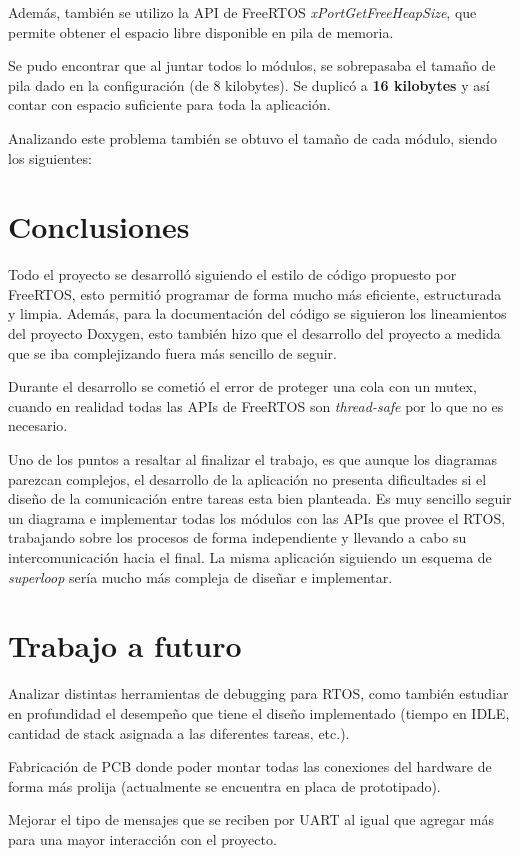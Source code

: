 \documentclass{IEEEtran}
\begin{document}
Además, también se utilizo la API de FreeRTOS \textit{xPortGetFreeHeapSize}, que permite obtener el espacio libre disponible en pila de memoria.

Se pudo encontrar que al juntar todos lo módulos, se sobrepasaba el tamaño de pila dado en la configuración (de 8 kilobytes). Se duplicó a \textbf{16 kilobytes} y así contar con espacio suficiente para toda la aplicación.

Analizando este problema también se obtuvo el tamaño de cada módulo, siendo los siguientes:

\section{Conclusiones}
\label{sec:conclusiones}
Todo el proyecto se desarrolló siguiendo el estilo de código propuesto por FreeRTOS, esto permitió programar de forma mucho más eficiente, estructurada y limpia. Además, para la documentación del código se siguieron los lineamientos del proyecto Doxygen, esto también hizo que el desarrollo del proyecto a medida que se iba complejizando fuera más sencillo de seguir.

Durante el desarrollo se cometió el error de proteger una cola con un mutex, cuando en realidad todas las APIs de FreeRTOS son \textit{thread-safe} por lo que no es necesario.

Uno de los puntos a resaltar al finalizar el trabajo, es que aunque los diagramas parezcan complejos, el desarrollo de la aplicación no presenta dificultades si el diseño de la comunicación entre tareas esta bien planteada. Es muy sencillo seguir un diagrama e implementar todas los módulos con las APIs que provee el RTOS, trabajando sobre los procesos de forma independiente y llevando a cabo su intercomunicación hacia el final. La misma aplicación siguiendo un esquema de \textit{superloop} sería mucho más compleja de diseñar e implementar.

\section{Trabajo a futuro}
Analizar distintas herramientas de debugging para RTOS, como también estudiar en profundidad el desempeño que tiene el diseño implementado (tiempo en IDLE, cantidad de stack asignada a las diferentes tareas, etc.).

Fabricación de PCB donde poder montar todas las conexiones del hardware de forma más prolija (actualmente se encuentra en placa de prototipado).

Mejorar el tipo de mensajes que se reciben por UART al igual que agregar más para una mayor interacción con el proyecto.

\printbibliography
\end{document}
